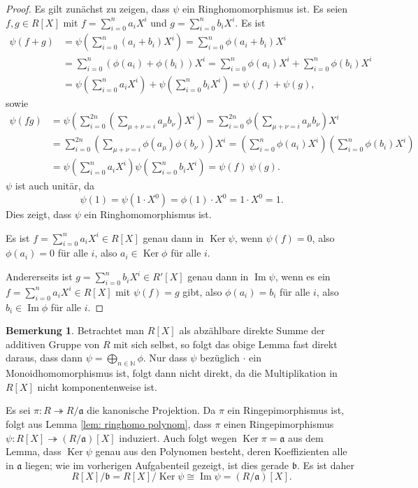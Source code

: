 \documentclass[a4paper,10pt]{article}
\theoremstyle{definition}
\newtheorem{bem}[beh]{Bemerkung}
\newcommand{\N}{\mathbb{N}}
\newcommand{\mf}[1]{\mathfrak{#1}}
\newcommand{\Img}{\operatorname{Im}}
\newcommand{\Ker}{\operatorname{Ker}}
\begin{document}
\begin{proof}
 Es gilt zunächst zu zeigen, dass $\psi$ ein Ringhomomorphismus ist. Es seien $f,g \in R[X]$ mit $f=\sum_{i=0}^n a_i X^i$ und $g=\sum_{i=0}^n b_i X^i$. Es ist
 \begin{align*}
  \psi(f+g)
  &= \psi\left( \sum_{i=0}^n (a_i+b_i) X^i \right)
  = \sum_{i=0}^n \phi(a_i+b_i) X^i \\
  &= \sum_{i=0}^n (\phi(a_i) + \phi(b_i)) X^i
  = \sum_{i=0}^n \phi(a_i) X^i  +  \sum_{i=0}^n \phi(b_i) X^i \\
  &= \psi\left( \sum_{i=0}^n a_i X^i \right) + \psi\left( \sum_{i=0}^n b_i X^i \right)
  = \psi(f) + \psi(g),
 \end{align*}
 sowie
 \begin{align*}
  \psi(f g)
  &= \psi\left( \sum_{i=0}^{2n} \left(\sum_{\mu+\nu=i} a_\mu b_\nu \right) X^i \right)
  = \sum_{i=0}^{2n} \phi \left(\sum_{\mu+\nu=i} a_\mu b_\nu \right) X^i \\
  &= \sum_{i=0}^{2n} \left(\sum_{\mu+\nu=i} \phi(a_\mu) \phi(b_\nu) \right) X^i
  = \left( \sum_{i=0}^n \phi(a_i) X^i \right)\left( \sum_{i=0}^n \phi(b_i) X^i \right)\\
  &= \psi \left( \sum_{i=0}^n a_i X^i \right) \psi \left( \sum_{i=0}^n b_i X^i \right)
  = \psi(f)\ \psi(g).
 \end{align*}
 $\psi$ ist auch unitär, da
 \[
  \psi(1) = \psi(1 \cdot X^0) = \phi(1) \cdot X^0 = 1 \cdot X^0 = 1.
 \]
 Dies zeigt, dass $\psi$ ein Ringhomomorphismus ist.
 
 Es ist $f = \sum_{i=0}^n a_i X^i \in R[X]$ genau dann in $\Ker \psi$, wenn $\psi(f) = 0$, also $\phi(a_i) = 0$ für alle $i$, also $a_i \in \Ker \phi$ für alle $i$.
 
 Andererseits ist $g = \sum_{i=0}^n b_i X^i \in R'[X]$ genau dann in $\Img \psi$, wenn es ein $f = \sum_{i=0}^n a_i X^i \in R[X]$ mit $\psi(f) = g$ gibt, also $\phi(a_i) = b_i$ für alle $i$, also $b_i \in \Img \phi$ für alle $i$.
\end{proof}

\begin{bem}
  Betrachtet man $R[X]$ als abzählbare direkte Summe der additiven Gruppe von $R$ mit sich selbst, so folgt das obige Lemma fast direkt daraus, dass dann $\psi = \bigoplus_{n \in \N} \phi$. Nur dass $\psi$ bezüglich $\cdot$ ein Monoidhomomorphismus ist, folgt dann nicht direkt, da die Multiplikation in $R[X]$ nicht komponentenweise ist.
\end{bem}

Es sei $\pi : R \twoheadrightarrow R/\mf{a}$ die kanonische Projektion. Da $\pi$ ein Ringepimorphismus ist, folgt aus Lemma \ref{lem: ringhomo polynom}, dass $\pi$ einen Ringepimorphismus $\psi: R[X] \twoheadrightarrow (R/\mf{a})[X]$ induziert. Auch folgt wegen $\Ker \pi = \mf{a}$ aus dem Lemma, dass $\Ker \psi$ genau aus den Polynomen besteht, deren Koeffizienten alle in $\mf{a}$ liegen; wie im vorherigen Aufgabenteil gezeigt, ist dies gerade $\mf{b}$. Es ist daher
\[
 R[X]/\mf{b} = R[X]/\Ker\psi \cong \Img\psi = (R/\mf{a})[X].
\]
\end{document}

